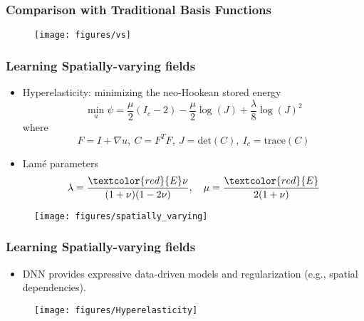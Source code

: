 \documentclass[usenames,dvipsnames]{beamer}
\begin{document}
\begin{frame}
	\frametitle{Comparison with Traditional Basis Functions}
	\begin{figure}[hbt]
		\texttt{[image: figures/vs]}
	\end{figure}
\end{frame}



\newcommand{\bsigma}[0]{\bm{\sigma}}
\newcommand{\bepsilon}[0]{\bm{\epsilon}}



\begin{frame}
	\frametitle{Learning Spatially-varying fields}
	
	\begin{itemize}
		\item Hyperelasticity: minimizing the neo-Hookean stored energy 
		$$\min_u \psi = \frac{\mu}{2}(I_c - 2) - \frac{\mu}{2}\log(J) + \frac{\lambda}{8}\log(J)^2$$
		where 
		$$F = I + \nabla u, \ C = F^TF, \ J = \text{det}(C), \ I_c = \text{trace}(C)$$
		\item Lam\'e parameters
		$$\lambda = \frac{\textcolor{red}{E}\nu}{(1+\nu)(1-2\nu)}, \quad \mu = \frac{\textcolor{red}{E}}{2(1+\nu)}$$
	\end{itemize}
	\begin{figure}[hbt]	
		\centering
		\texttt{[image: figures/spatially\_varying]}
	\end{figure}
\end{frame}


\begin{frame}
	\frametitle{Learning Spatially-varying fields}
	\begin{itemize}
		\item DNN provides expressive data-driven models and regularization (e.g., spatial dependencies). 
	\end{itemize}
	\vspace{-0.1cm}
	\begin{figure}[hbt]	
		\centering
		\texttt{[image: figures/Hyperelasticity]}
	\end{figure}
\end{frame}
\end{document}
